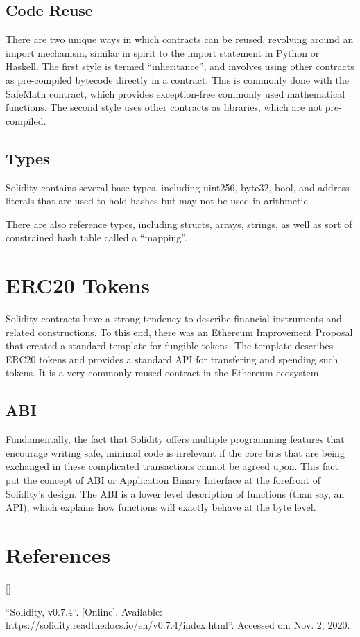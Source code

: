 \documentclass[twoside]{article}
\def\beginrefs{\begin{list}%
        {[\arabic{equation}]}{\usecounter{equation}
         \setlength{\leftmargin}{2.0truecm}\setlength{\labelsep}{0.4truecm}%
         \setlength{\labelwidth}{1.6truecm}}}
\def\endrefs{\end{list}}
\def\bibentry#1{\item[\hbox{[#1]}]}
\begin{document}
\subsection{Code Reuse}

There are two unique ways in which contracts can be reused, revolving around an
import mechanism, similar in spirit to the import statement in Python or Haskell.
The first style is termed ``inheritance'', and involves using other contracts as
pre-compiled bytecode directly in a contract.  This is commonly done with the
SafeMath contract, which provides exception-free commonly used mathematical functions.
The second style uses other contracts as libraries, which are not pre-compiled.  

\subsection{Types}

Solidity contains several base types, including uint256, byte32, bool, and
address literals that are used to hold hashes but may not be used in arithmetic.

There are also reference types, including structs, arrays, strings, as well as
sort of constrained hash table called a ``mapping''.  

\section{ERC20 Tokens}

Solidity contracts have a strong tendency to describe financial instruments and
related constructions.  To this end, there was an Ethereum Improvement Proposal
that created a standard template for fungible tokens.  The template describes
ERC20 tokens and provides a standard API for transfering and spending such
tokens.  It is a very commonly reused contract in the Ethereum ecosystem.

\subsection{ABI}

Fundamentally, the fact that Solidity offers multiple programming features that
encourage writing safe, minimal code is irrelevant if the core bits that are
being exchanged in these complicated transactions cannot be agreed upon.  This
fact put the concept of ABI or Application Binary Interface at the forefront of
Solidity's design.  The ABI is a lower level description of functions (than say,
an API), which explains how functions will exactly behave at the byte level.  

\section*{References}
\beginrefs

\bibentry{Sol} ``Solidity, v0.7.4``. [Online]. Available: https://solidity.readthedocs.io/en/v0.7.4/index.html''.  Accessed on: Nov. 2, 2020.

\endrefs

\end{document}
